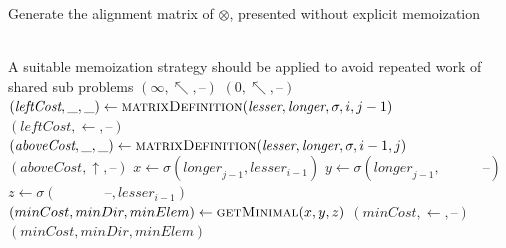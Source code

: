 \documentclass{bmcart}
\newcommand*\NEPowerset{\mathcal{P}_{\geq 1}}
\newcommand*\NonNegReals{\mathbb{R}_{\geq 0}}
\begin{document}
\begin{backmatter}
	\begin{algorithm}
		\caption{Generate the alignment matrix of $\otimes$, presented without explicit memoization}
		\label{Alg:matrixDefinition}
		\begin{algorithmic}[1]
			\Require{$\sigma \,:\, \NEPowerset(\Sigma) \times \NEPowerset(\Sigma) \rightarrow \left(\NonNegReals,\, \NEPowerset(\Sigma) \right)$}
			\Ensure{($\NonNegReals$, $\mathbf{Dir}$, $\Sigma_{\Gamma}$)}\\
			 A suitable memoization strategy should be applied to avoid repeated work of shared sub problems
			 
			\State \Return $\left( \infty, \nwarrow, \textbf{--} \right)$
			 
			\State \Return $\left( 0, \nwarrow, \textbf{--} \right)$
			 
			\State $\left(\textit{leftCost}, \_, \_ \right) \gets \Call{matrixDefinition}{\textit{lesser}, \textit{longer}, \sigma, i, j - 1}$
			\State \Return $\left( \textit{leftCost}, \leftarrow, \textbf{--} \right)$
			 
			\State $\left(\textit{aboveCost}, \_, \_ \right) \gets \Call{matrixDefinition}{\textit{lesser}, \textit{longer}, \sigma, i - 1, j}$
			\State \Return $\left( \textit{aboveCost}, \uparrow, \textbf{--} \right)$
			\Else {}
			\State $x \gets \sigma \left(           \textit{longer}_{j-1}, \textit{lesser}_{i-1} \right)$
			\State $y \gets \sigma \left(           \textit{longer}_{j-1}, \quad\quad\quad \textbf{--} \right)$
			\State $z \gets \sigma \left( \quad\quad\quad\;\, \textbf{--}, \textit{lesser}_{i-1} \right)$
			\State $\left( minCost, minDir, minElem \right) \gets \Call{getMinimal}{x, y, z}$ 
			 
			\State \Return $\left( minCost, \leftarrow, \textbf{--} \right)$
			\Else
			\State \Return $\left( minCost, minDir, minElem \right)$
			\EndIf
			\EndIf
			\EndFunction
		\end{algorithmic}
	\end{algorithm}
	

\end{backmatter}
\end{document}
